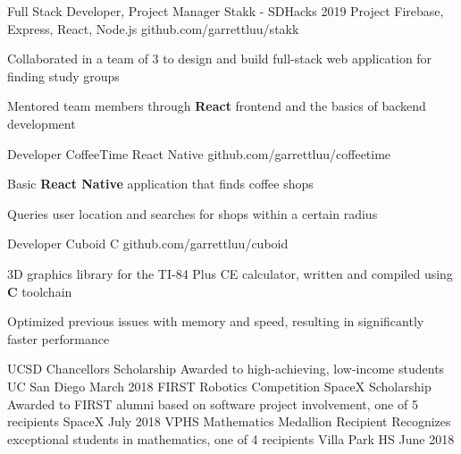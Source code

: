 \documentclass[]{awesome-cv}
\begin{document}
\vspace{-5mm}
\begin{cventries}

	\cventry
  {Full Stack Developer, Project Manager}
  {Stakk - SDHacks 2019 Project}
	{Firebase, Express, React, Node.js}
	{github.com/garrettluu/stakk}
  {\begin{cvitems}
    \item{Collaborated in a team of 3 to design and build full-stack web
      application for finding study groups}
    \item{Mentored team members through \textbf{React} frontend and the basics
      of backend development}
    \end{cvitems}}

  \vspace{-3mm}
	\cventry
  {Developer}
  {CoffeeTime}
  {React Native}
	{github.com/garrettluu/coffeetime}
  {\begin{cvitems}
    \item{Basic \textbf{React Native} application that finds coffee shops}
    \item{Queries user location and searches for shops within a certain radius}
    \end{cvitems}}

  \vspace{-3mm}
	\cventry
  {Developer}
	{Cuboid}
	{C}
	{github.com/garrettluu/cuboid}
  {\begin{cvitems}
	  \item{3D graphics library for the TI-84 Plus CE calculator, written and
      compiled using \textbf{C} toolchain}
    \item{Optimized previous issues with memory and speed, resulting in
      significantly faster performance}
    \end{cvitems}}

\end{cventries}

\vspace{-5mm}
\begin{cvhonors}
	\cvhonor
	{UCSD Chancellor\textquotesingle{}s Scholarship}
	{Awarded to high-achieving, low-income students}
	{UC San Diego}
	{March 2018}
	\cvhonor
	{FIRST Robotics Competition SpaceX Scholarship}
	{Awarded to FIRST alumni based on software project involvement, one of 5
    recipients}
	{SpaceX}
	{July 2018}
	\cvhonor
	{VPHS Mathematics Medallion Recipient}
	{Recognizes exceptional students in mathematics, one of 4 recipients}
	{Villa Park HS}
	{June 2018}
\end{cvhonors}
\end{document}
